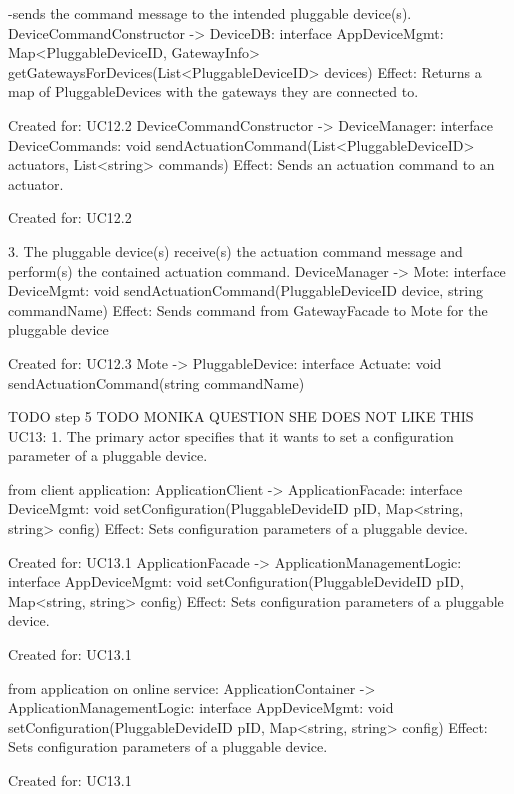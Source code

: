                 -sends the command message to the intended pluggable device(s).
                    DeviceCommandConstructor -> DeviceDB:      interface AppDeviceMgmt: Map<PluggableDeviceID, GatewayInfo> getGatewaysForDevices(List<PluggableDeviceID> devices)
                        Effect: Returns a map of PluggableDevices with the gateways they are connected to.
                        \item Created for: UC12.2
                    DeviceCommandConstructor -> DeviceManager: interface DeviceCommands: void sendActuationCommand(List<PluggableDeviceID> actuators, List<string> commands)
                        Effect: Sends an actuation command to an actuator.
                        \item Created for: UC12.2

            3. The pluggable device(s) receive(s) the actuation command message and perform(s) the contained actuation command.
                    DeviceManager -> Mote: interface DeviceMgmt: void sendActuationCommand(PluggableDeviceID device, string commandName)
                    Effect: Sends command from GatewayFacade to Mote for the pluggable device
                        \item Created for: UC12.3
                    Mote -> PluggableDevice: interface Actuate:    void sendActuationCommand(string commandName)


        TODO step 5
        TODO MONIKA QUESTION SHE DOES NOT LIKE THIS
        UC13:
            1. The primary actor specifies that it wants to set a configuration parameter of a pluggable device.

                from client application:
                    ApplicationClient -> ApplicationFacade:           interface DeviceMgmt:       void setConfiguration(PluggableDevideID pID, Map<string, string> config)
                        Effect: Sets configuration parameters of a pluggable device.
                        \item Created for: UC13.1
                    ApplicationFacade -> ApplicationManagementLogic:  interface AppDeviceMgmt:  void setConfiguration(PluggableDevideID pID, Map<string, string> config)
                        Effect: Sets configuration parameters of a pluggable device.
                        \item Created for: UC13.1

                from application on online service:
                    ApplicationContainer -> ApplicationManagementLogic: interface AppDeviceMgmt: void setConfiguration(PluggableDevideID pID, Map<string, string> config)
                        Effect: Sets configuration parameters of a pluggable device.
                        \item Created for: UC13.1

